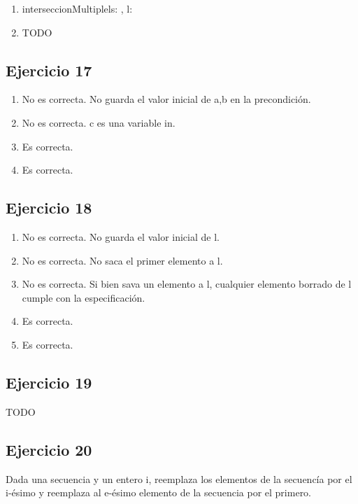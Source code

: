 \begin{enumerate}
        {(\forall k: \ent)(k \in t \implica (\exists l: \ent)(l \in s \y l \geq k))}
        
    \item   \begin{proc}{interseccionMultiple}{\In ls: \TLista{\TLista{\float}}, \Out l: \TLista{\float}}{}
            \end{proc}
    \item   TODO
\end{enumerate}

\subsection{Ejercicio 17}
\begin{enumerate}
    \item No es correcta. No guarda el valor inicial de a,b en la precondición. 
    \item No es correcta. c es una variable in.
    \item Es correcta.
    \item Es correcta.
\end{enumerate}

\subsection{Ejercicio 18}
\begin{enumerate}
    \item No es correcta. No guarda el valor inicial de l.
    \item No es correcta. No saca el primer elemento a l.
    \item No es correcta. Si bien sava un elemento a l, cualquier elemento borrado de l cumple con la especificación.
    \item Es correcta.
    \item Es correcta.
\end{enumerate}

\subsection{Ejercicio 19}
TODO

\subsection{Ejercicio 20}
Dada una secuencia y un entero i, reemplaza los elementos de la secuencía por el i-ésimo y reemplaza al e-ésimo elemento de la secuencia por el primero.

